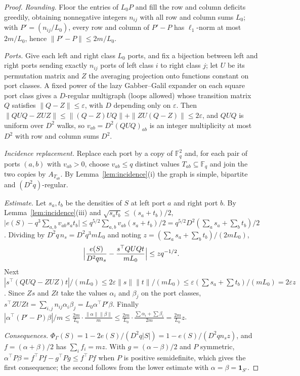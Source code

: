 \documentclass[11pt,letterpaper]{article}
\theoremstyle{definition}
\theoremstyle{remark}
\newcommand{\F}{\mathbb F}
\newcommand{\eps}{\varepsilon}
\newcommand{\ind}{\mathbf 1}
\begin{document}
\begin{proof}
\emph{Rounding.} Floor the entries of \(L_0P\) and fill the row and column
deficits greedily, obtaining nonnegative integers \(n_{ij}\) with all row and
column sums \(L_0\); with \(P'=(n_{ij}/L_0)\), every row and column of
\(P'-P\) has \(\ell_1\)-norm at most \(2m/L_0\), hence
\(\|P'-P\|\le2m/L_0\).

\emph{Ports.} Give each left and right class \(L_0\) ports, and fix a
bijection between left and right ports sending exactly \(n_{ij}\) ports of
left class \(i\) to right class \(j\); let \(U\) be its permutation matrix and
\(Z\) the averaging projection onto functions constant on port classes. A
fixed power of the lazy Gabber--Galil expander \cite{gg81} on each square
port class gives a \(D\)-regular multigraph (loops allowed) whose transition
matrix \(Q\) satisfies \(\|Q-Z\|\le\eps\), with \(D\) depending only on
\(\eps\). Then \(\|QUQ-ZUZ\|\le\|(Q-Z)UQ\|+\|ZU(Q-Z)\|\le2\eps\), and \(QUQ\)
is uniform over \(D^2\) walks, so \(v_{ab}=D^2(QUQ)_{ab}\) is an integer
multiplicity at most \(D^2\) with row and column sums \(D^2\).

\emph{Incidence replacement.} Replace each port by a copy of \(\F_q^2\) and,
for each pair of ports \((a,b)\) with \(v_{ab}>0\), choose \(v_{ab}\le q\)
distinct values \(T_{ab}\subseteq\F_q\) and join the two copies by
\(A_{T_{ab}}\). By Lemma~\ref{lem:incidence}(i) the graph is simple,
bipartite and \((D^2q)\)-regular.

\emph{Estimate.} Let \(s_a,t_b\) be the densities of \(S\) at left port \(a\)
and right port \(b\). By Lemma~\ref{lem:incidence}(iii) and
\(\sqrt{s_at_b}\le(s_a+t_b)/2\),
\(\bigl|e(S)-q^3\sum_{a,b}v_{ab}s_at_b\bigr|\le q^{5/2}\sum_{a,b}v_{ab}
(s_a+t_b)/2=q^{5/2}D^2(\sum_as_a+\sum_bt_b)/2\). Dividing by
\(D^2q\,n_s=D^2q^3mL_0\) and noting \(z=(\sum_as_a+\sum_bt_b)/(2mL_0)\),
\[
\Bigl|\frac{e(S)}{D^2qn_s}-\frac{s^{\top}QUQt}{mL_0}\Bigr|\le zq^{-1/2}.
\]
Next \(|s^{\top}(QUQ-ZUZ)t|/(mL_0)\le2\eps\|s\|\|t\|/(mL_0)\le
\eps(\sum s_a+\sum t_b)/(mL_0)=2\eps z\). Since \(Zs\) and \(Zt\) take the
values \(\alpha_i\) and \(\beta_j\) on the port classes,
\(s^{\top}ZUZt=\sum_{i,j}n_{ij}\alpha_i\beta_j=L_0\alpha^{\top}P'\beta\).
Finally \(|\alpha^{\top}(P'-P)\beta|/m\le\frac{2m}{L_0}\cdot\frac{\|\alpha\|
\|\beta\|}m\le\frac{2m}{L_0}\cdot\frac{\sum\alpha_i+\sum\beta_i}{2m}=
\frac{2m}{L_0}z\).

\emph{Consequences.} \(\Phi_\Gamma(S)=1-2e(S)/(D^2q|S|)=1-e(S)/(D^2qn_sz)\),
and \(f=(\alpha+\beta)/2\) has \(\sum_if_i=mz\). With \(g=(\alpha-\beta)/2\)
and \(P\) symmetric, \(\alpha^{\top}P\beta=f^{\top}Pf-g^{\top}Pg\le
f^{\top}Pf\) when \(P\) is positive semidefinite, which gives the first
consequence; the second follows from the lower estimate with
\(\alpha=\beta=\ind_{S'}\).
\end{proof}
\end{document}
